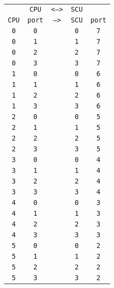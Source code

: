 \begin{adjustwidth}{5ex}{1ex}
	\begin{tabular}{ccccc}
		& \texttt{CPU} & \texttt{<-->} & \texttt{SCU} &  \\
		\texttt{CPU} & \texttt{port} & \texttt{-->} & \texttt{SCU} & \texttt{port} \\
		\texttt{0} & \texttt{0} & & \texttt{0} & \texttt{7} \\
		\texttt{0} & \texttt{1} & & \texttt{1} & \texttt{7} \\
		\texttt{0} & \texttt{2} & & \texttt{2} & \texttt{7} \\
		\texttt{0} & \texttt{3} & & \texttt{3} & \texttt{7} \\
		\texttt{1} & \texttt{0} & & \texttt{0} & \texttt{6} \\
		\texttt{1} & \texttt{1} & & \texttt{1} & \texttt{6} \\
		\texttt{1} & \texttt{2} & & \texttt{2} & \texttt{6} \\
		\texttt{1} & \texttt{3} & & \texttt{3} & \texttt{6} \\
		\texttt{2} & \texttt{0} & & \texttt{0} & \texttt{5} \\
		\texttt{2} & \texttt{1} & & \texttt{1} & \texttt{5} \\
		\texttt{2} & \texttt{2} & & \texttt{2} & \texttt{5} \\
		\texttt{2} & \texttt{3} & & \texttt{3} & \texttt{5} \\
		\texttt{3} & \texttt{0} & & \texttt{0} & \texttt{4} \\
		\texttt{3} & \texttt{1} & & \texttt{1} & \texttt{4} \\
		\texttt{3} & \texttt{2} & & \texttt{2} & \texttt{4} \\
		\texttt{3} & \texttt{3} & & \texttt{3} & \texttt{4} \\
		\texttt{4} & \texttt{0} & & \texttt{0} & \texttt{3} \\
		\texttt{4} & \texttt{1} & & \texttt{1} & \texttt{3} \\
		\texttt{4} & \texttt{2} & & \texttt{2} & \texttt{3} \\
		\texttt{4} & \texttt{3} & & \texttt{3} & \texttt{3} \\
		\texttt{5} & \texttt{0} & & \texttt{0} & \texttt{2} \\
		\texttt{5} & \texttt{1} & & \texttt{1} & \texttt{2} \\
		\texttt{5} & \texttt{2} & & \texttt{2} & \texttt{2} \\
		\texttt{5} & \texttt{3} & & \texttt{3} & \texttt{2} \\
	\end{tabular}
\end{adjustwidth}

